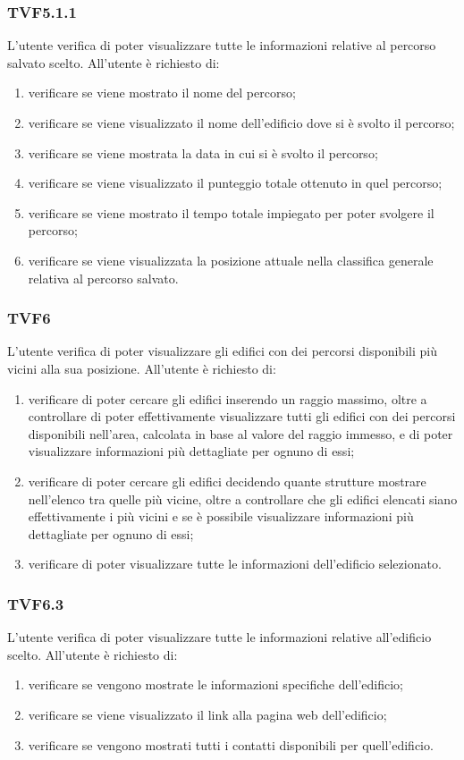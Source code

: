 		\subsubsection{TVF5.1.1}
			L'utente verifica di poter visualizzare tutte le informazioni relative al percorso salvato scelto.
			All'utente è richiesto di:
			\begin{enumerate}
				\item verificare se viene mostrato il nome del percorso;
				\item verificare se viene visualizzato il nome dell'edificio dove si è svolto il percorso;
				\item verificare se viene mostrata la data in cui si è svolto il percorso;
				\item verificare se viene visualizzato il punteggio totale ottenuto in quel percorso;
				\item verificare se viene mostrato il tempo totale impiegato per poter svolgere il percorso;
				\item verificare se viene visualizzata la posizione attuale nella classifica generale relativa al percorso salvato.
			\end{enumerate}
		\subsubsection{TVF6}
			L'utente verifica di poter visualizzare gli edifici con dei percorsi disponibili più vicini alla sua posizione.
			All'utente è richiesto di:
			\begin{enumerate}
				\item verificare di poter cercare gli edifici inserendo un raggio massimo, oltre a controllare di poter effettivamente visualizzare tutti gli edifici con dei percorsi disponibili nell'area, calcolata in base al valore del raggio immesso, e di poter visualizzare informazioni più dettagliate per ognuno di essi;
				\item verificare di poter cercare gli edifici decidendo quante strutture mostrare nell'elenco tra quelle più vicine, oltre a controllare che gli edifici elencati siano effettivamente i più vicini e se è possibile visualizzare informazioni più dettagliate per ognuno di essi;
				\item verificare di poter visualizzare tutte le informazioni dell'edificio selezionato.
			\end{enumerate}
		\subsubsection{TVF6.3}
			L'utente verifica di poter visualizzare tutte le informazioni relative all'edificio scelto.
			All'utente è richiesto di:
			\begin{enumerate}
				\item verificare se vengono mostrate le informazioni specifiche dell'edificio;
				\item verificare se viene visualizzato il link alla pagina web dell'edificio;
				\item verificare se vengono mostrati tutti i contatti disponibili per quell'edificio.
			\end{enumerate}
